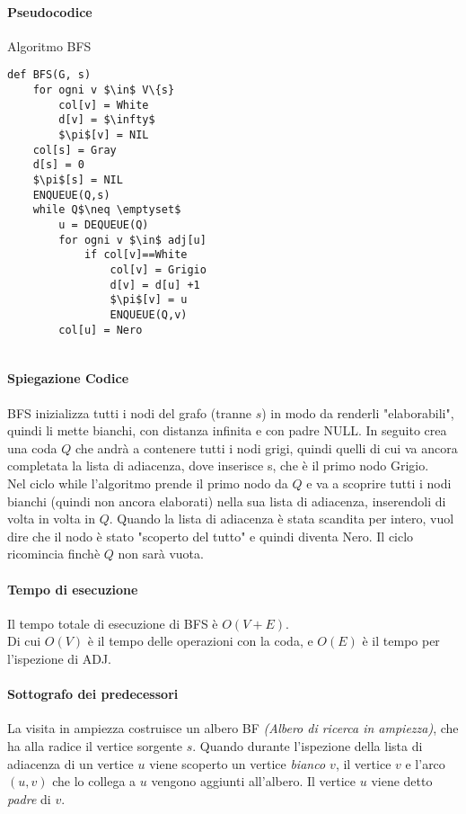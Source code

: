 \paragraph{Pseudocodice} Algoritmo BFS
\begin{lstlisting}
def BFS(G, s)
    for ogni v $\in$ V\{s}
        col[v] = White
        d[v] = $\infty$
        $\pi$[v] = NIL
    col[s] = Gray
    d[s] = 0
    $\pi$[s] = NIL
    ENQUEUE(Q,s)
    while Q$\neq \emptyset$
        u = DEQUEUE(Q)
        for ogni v $\in$ adj[u]
            if col[v]==White
                col[v] = Grigio
                d[v] = d[u] +1
                $\pi$[v] = u
                ENQUEUE(Q,v)
        col[u] = Nero
    
\end{lstlisting}
\paragraph{Spiegazione Codice}
BFS inizializza tutti i nodi del grafo (tranne $s$) in modo da renderli "elaborabili", quindi li mette bianchi, con distanza infinita e con padre NULL.
In seguito crea una coda $Q$ che andrà a contenere tutti i nodi grigi, quindi quelli di cui va ancora completata la lista di adiacenza,
dove inserisce s, che è il primo nodo Grigio.
\\Nel ciclo while l'algoritmo prende il primo nodo da $Q$ e va a scoprire tutti i nodi bianchi (quindi non ancora elaborati) nella sua lista di adiacenza, inserendoli di volta in volta in $Q$.
Quando la lista di adiacenza è stata scandita per intero, vuol dire che il nodo è stato "scoperto del tutto" e quindi diventa Nero.
Il ciclo ricomincia finchè $Q$ non sarà vuota.

\paragraph*{Tempo di esecuzione}
Il tempo totale di esecuzione di BFS è $O(V + E)$.\\
Di cui $O(V)$ è il tempo delle operazioni con la coda, e $O(E)$ è il tempo per l'ispezione di ADJ.

\paragraph{Sottografo dei predecessori}
La visita in ampiezza costruisce un albero BF \emph{(Albero di ricerca in ampiezza)}, che ha alla radice il vertice sorgente $s$.
Quando durante l'ispezione della lista di adiacenza di un vertice $u$ viene scoperto un vertice \emph{ bianco $v$},
il vertice $v$ e l'arco $(u,v)$ che lo collega a $u$ vengono aggiunti all'albero.
Il vertice $u$ viene detto \emph{padre} di $v$.


